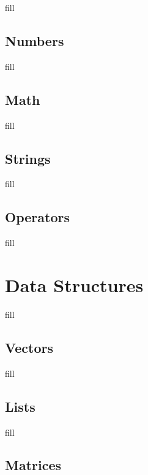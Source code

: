 \documentclass[
  b5paper]{book}
\begin{document}
fill

\hypertarget{numbers}{%
\subsection*{Numbers}\label{numbers}}

fill

\hypertarget{math}{%
\subsection*{Math}\label{math}}

fill

\hypertarget{strings}{%
\subsection*{Strings}\label{strings}}

fill

\hypertarget{operators}{%
\subsection*{Operators}\label{operators}}

fill

\hypertarget{data-structures}{%
\section{Data Structures}\label{data-structures}}

fill

\hypertarget{vectors}{%
\subsection*{Vectors}\label{vectors}}

fill

\hypertarget{lists}{%
\subsection*{Lists}\label{lists}}

fill

\hypertarget{matrices}{%
\subsection*{Matrices}\label{matrices}}
\end{document}
